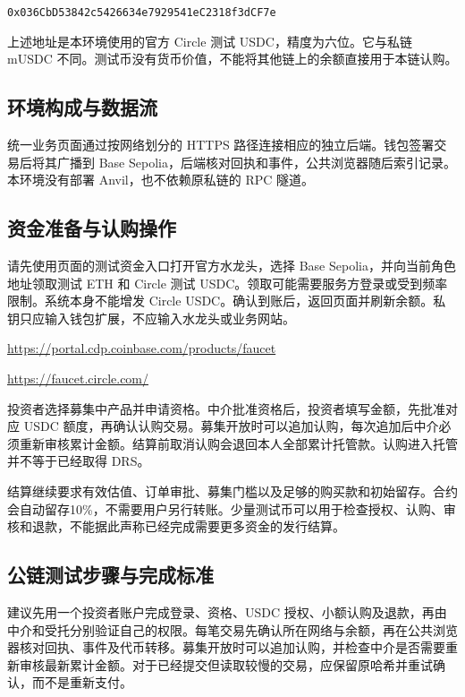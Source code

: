 \documentclass[12pt,a4paper]{article}
\begin{document}
\nolinkurl{0x036CbD53842c5426634e7929541eC2318f3dCF7e}\par
上述地址是本环境使用的官方 Circle 测试 USDC，精度为六位。它与私链 mUSDC 不同。测试币没有货币价值，不能将其他链上的余额直接用于本链认购。

\subsection{环境构成与数据流}
\begin{center}\end{center}
统一业务页面通过按网络划分的 HTTPS 路径连接相应的独立后端。钱包签署交易后将其广播到 Base Sepolia，后端核对回执和事件，公共浏览器随后索引记录。本环境没有部署 Anvil，也不依赖原私链的 RPC 隧道。

\subsection{资金准备与认购操作}
请先使用页面的测试资金入口打开官方水龙头，选择 Base Sepolia，并向当前角色地址领取测试 ETH 和 Circle 测试 USDC。领取可能需要服务方登录或受到频率限制。系统本身不能增发 Circle USDC。确认到账后，返回页面并刷新余额。私钥只应输入钱包扩展，不应输入水龙头或业务网站。

\url{https://portal.cdp.coinbase.com/products/faucet}\par\url{https://faucet.circle.com/}\par
投资者选择募集中产品并申请资格。中介批准资格后，投资者填写金额，先批准对应 USDC 额度，再确认认购交易。募集开放时可以追加认购，每次追加后中介必须重新审核累计金额。结算前取消认购会退回本人全部累计托管款。认购进入托管并不等于已经取得 DRS。

结算继续要求有效估值、订单审批、募集门槛以及足够的购买款和初始留存。合约会自动留存10\%，不需要用户另行转账。少量测试币可以用于检查授权、认购、审核和退款，不能据此声称已经完成需要更多资金的发行结算。

\subsection{公链测试步骤与完成标准}
建议先用一个投资者账户完成登录、资格、USDC 授权、小额认购及退款，再由中介和受托分别验证自己的权限。每笔交易先确认所在网络与余额，再在公共浏览器核对回执、事件及代币转移。募集开放时可以追加认购，并检查中介是否需要重新审核最新累计金额。对于已经提交但读取较慢的交易，应保留原哈希并重试确认，而不是重新支付。
\end{document}
